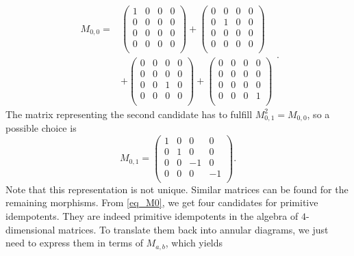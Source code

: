 	\begin{equation}
	\begin{split}
	\label{eq_M0}
		M_{0,0}={}&
		\begin{pmatrix}
		1 & 0 & 0 & 0\\
		0 & 0 & 0 & 0\\
		0 & 0 & 0 & 0\\
		0 & 0 & 0 & 0\\
		\end{pmatrix}
		+\begin{pmatrix}
		0 & 0 & 0 & 0\\
		0 & 1 & 0 & 0\\
		0 & 0 & 0 & 0\\
		0 & 0 & 0 & 0\\
		\end{pmatrix}\\
		&+
		\begin{pmatrix}
		0 & 0 & 0 & 0\\
		0 & 0 & 0 & 0\\
		0 & 0 & 1 & 0\\
		0 & 0 & 0 & 0\\
		\end{pmatrix}
		+\begin{pmatrix}
		0 & 0 & 0 & 0\\
		0 & 0 & 0 & 0\\
		0 & 0 & 0 & 0\\
		0 & 0 & 0 & 1\\
		\end{pmatrix}
	\end{split}		.
	\end{equation}
The matrix representing the second candidate has to fulfill $M_{0,1}^2=M_{0,0}$, so a possible choice is
	\begin{equation}
		M_{0,1}=\begin{pmatrix}
			1 & 0 & 0 & 0\\
			0 & 1 & 0 & 0\\
			0 & 0 & -1 & 0\\
			0 & 0 & 0 & -1\\
		\end{pmatrix}.
	\end{equation}
	Note that this representation is not unique. Similar matrices can be found for the remaining morphisms.
From \eqref{eq_M0}, we get four candidates for primitive idempotents. They are indeed primitive idempotents in the algebra of $4$-dimensional matrices. To translate them back into annular diagrams, we just need to express them in terms of $M_{a,b}$, which yields
